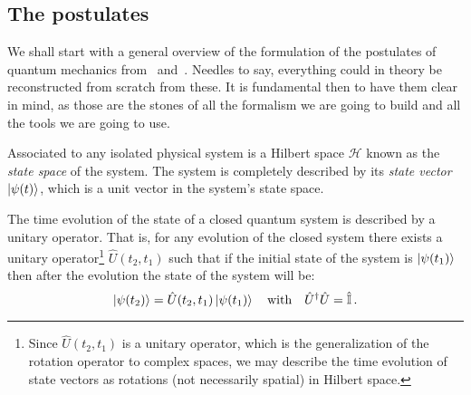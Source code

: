 
\subsection{The postulates}
We shall start with a general overview of the formulation of the postulates of quantum mechanics from~\cite{Shankar} and~\cite{NielsenChuang}. Needles to say, everything could in theory be reconstructed from scratch from these. It is fundamental then to have them clear in mind, as those are the stones of all the formalism we are going to build and all the tools we are going to use. 
\begin{postulate}\label{postulate:1}
Associated to any isolated physical system is a Hilbert space $\mathcal{H}$ known as the \emph{state space} of the
system. The system is completely described by its \emph{state vector} $\ket{\psi(t)}$, which is a unit
vector in the system’s state space.
\end{postulate}
\begin{postulate}\label{postulate:2}
The time evolution of the state of a closed quantum system is described by a
unitary operator. That is, for any evolution of the closed system there exists
a unitary operator\footnote{Since $\widehat{U}(t_2,t_1)$ is a unitary operator, which is the generalization of the rotation operator to complex spaces, we may describe the time evolution of state vectors as rotations (not necessarily spatial) in Hilbert space.} $\widehat{U}(t_2,t_1)$ such that if the initial state of the system is $\ket{\psi(t_1)}$ then
after the evolution the state of the system will be:
\begin{equation*}
    \ket{\psi(t_2)} = \hat{U}(t_2,t_1) \ket{\psi(t_1)} \quad \text{with} \quad \hat{U}^\dagger\hat{U} = \hat{\mathbb{I}}\,.
\end{equation*}
\end{postulate}
